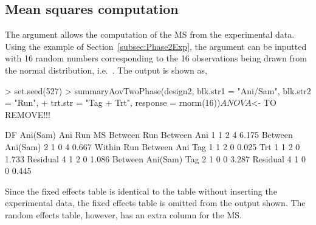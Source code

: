 \documentclass[article]{jss}
\begin{document}
\subsection{Mean squares computation}
The argument  allows the computation of the MS from the experimental data. Using the example of Section~\ref{subsec:Phase2Exp}, the  argument can be inputted with 16 random numbers corresponding to the 16 observations being drawn from the normal distribution, i.e.\ . The output is shown as,
\begin{CodeChunk}
\begin{CodeInput} 
> set.seed(527)
> summaryAovTwoPhase(design2, blk.str1 = "Ani/Sam", blk.str2 = "Run", 
+  trt.str = "Tag + Trt", response = rnorm(16))$ANOVA
$<- TO REMOVE!!!
\end{CodeInput}
\begin{CodeOutput} 
                    DF Ani(Sam) Ani Run MS   
Between Run                                  
   Between Ani      1  1        2   4   6.175
   Between Ani(Sam) 2  1        0   4   0.667
Within Run                                   
   Between Ani                               
      Tag           1  1        2   0   0.025
      Trt           1  1        2   0   1.733
      Residual      4  1        2   0   1.086
   Between Ani(Sam)                          
      Tag           2  1        0   0   3.287
      Residual      4  1        0   0   0.445
\end{CodeOutput}
\end{CodeChunk}  
Since the fixed effects table is identical to the table without inserting the experimental data, the fixed effects table is omitted from the output shown. The random effects table, however, has an extra column for the MS.
\end{document}
